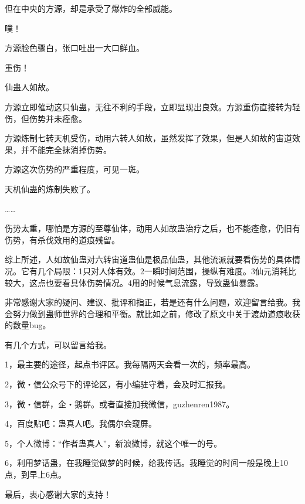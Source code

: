 \begin{this_body}
但在中央的方源，却是承受了爆炸的全部威能。

噗！

方源脸色骤白，张口吐出一大口鲜血。

重伤！

仙蛊人如故。

方源立即催动这只仙蛊，无往不利的手段，立即显现出良效。方源重伤直接转为轻伤，但伤势并未痊愈。

方源炼制七转天机受伤，动用六转人如故，虽然发挥了效果，但是人如故的宙道效果，并不能完全抹消掉伤势。

方源这次伤势的严重程度，可见一斑。

天机仙蛊的炼制失败了。

……

伤势太重，哪怕是方源的至尊仙体，动用人如故蛊治疗之后，也不能痊愈，仍旧有伤势，有杀伐效用的道痕残留。

综上所述，人如故仙蛊对六转宙道蛊仙是极品仙蛊，其他流派就要看伤势的具体情况。它有几个局限：1只对人体有效。2一瞬时间范围，操纵有难度。3仙元消耗比较大，这点也要看具体伤势情况。4用的时候气息流露，导致蛊仙暴露。

非常感谢大家的疑问、建议、批评和指正，若是还有什么问题，欢迎留言给我。我会努力做到蛊师世界的合理和平衡。就比如之前，修改了原文中关于渡劫道痕收获的数量bug。

有几个方式，可以留言给我。

1，最主要的途径，起点书评区。我每隔两天会看一次的，频率最高。

2，微・信公众号下的评论区，有小编驻守着，会及时汇报我。

3，微・信群，企・鹅群。或者直接加我微信，guzhenren1987。

4，百度贴吧：蛊真人吧。我偶尔会窥屏。

5，个人微博：“作者蛊真人”，新浪微博，就这个唯一的号。

6，利用梦话蛊，在我睡觉做梦的时候，给我传话。我睡觉的时间一般是晚上10点，到早上6点。

最后，衷心感谢大家的支持！

\end{this_body}

